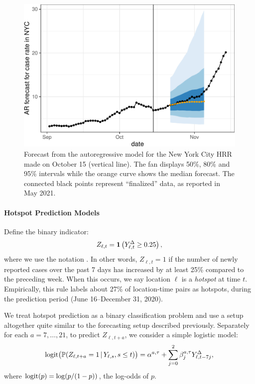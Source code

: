 \documentclass[9pt,twocolumn,twoside,lineno]{pnas-new}
\begin{document}
\begin{figure}[t]
\includegraphics[width=\columnwidth]{fig/ny-trajectory-1.pdf}
\caption{Forecast from the autoregressive model for the New York City HRR made
  on October 15 (vertical line).  The fan displays 50\%, 80\% and 95\% intervals
  while the orange curve shows the median forecast. The connected black points
  represent ``finalized'' data, as reported in May 2021.}
\label{fig:trajectory}
\end{figure}

\paragraph{Hotspot Prediction Models}

Define the binary indicator:
$$
Z_{\ell,t} = \mathbf{1}\left(Y^\Delta_{\ell,t} \geq 0.25\right),
$$
where we use the notation . In other words, $Z_{\ell,t}=1$ if the number of
newly reported cases over the past 7 days has increased by at least 25\%
compared to the preceding week.  When this occurs, we say location $\ell$ is a
\textit{hotspot} at time $t$.  Empirically, this rule labels about 27\% of
location-time pairs as hotspots, during the prediction period (June 16--December
31, 2020).  

We treat hotspot prediction as a binary classification problem and use a setup 
altogether quite similar to the forecasting setup described previously.
Separately for each $a=7,\ldots,21$, to predict $Z_{\ell,t+a}$, we consider a
simple logistic model:
\begin{equation}
\label{eq:hotspot_ar}
\mathrm{logit} \big( \mathbb{P}(Z_{\ell,t+a} = 1 \,|\, Y_{\ell,s}, s \leq t) \big) 
= \alpha^{a,\tau} + \sum_{j=0}^2 \beta^{a,\tau}_j Y^\Delta_{\ell,t-7j},
\end{equation}
where $\mathrm{logit}(p) = \log(p/(1-p))$, the log-odds of $p$.
\end{document}
